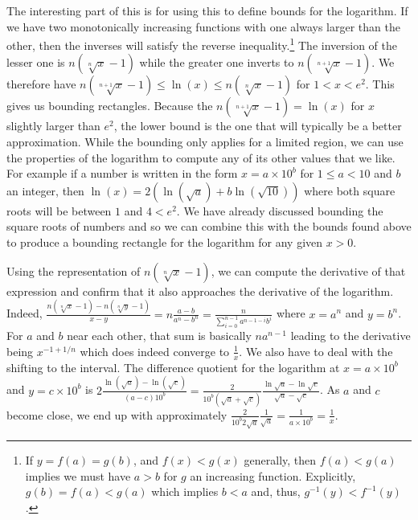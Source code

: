 \documentclass[12pt]{article}
\begin{document}
The interesting part of this is for using this to define bounds for the logarithm. If we have two monotonically increasing functions with one always larger than the other, then the inverses will satisfy the reverse inequality.\footnote{If $y = f(a)=g(b)$, and $f(x) < g(x)$ generally, then $f(a) < g(a)$ implies we must have $a > b$ for $g$ an increasing function. Explicitly, $g(b) = f(a) < g(a)$ which implies $b < a$ and, thus, $g^{-1} (y) < f^{-1} (y)$.}  The inversion of the lesser one is $n(\sqrt[n]{ x }- 1)$ while the greater one inverts to $n(\sqrt[n+1]{x} - 1)$. We therefore have $n(\sqrt[n+1]{x} - 1) \leq \ln(x) \leq n (\sqrt[n]{x}-1)$ for $1 < x < e^2$. This gives us bounding rectangles. Because the $n (\sqrt[n+1]{x} - 1) = \ln(x)$ for $x$ slightly larger than $e^2$, the lower bound is the one that will typically be a better approximation.  While the bounding only applies for a limited region, we can use the properties of the logarithm to compute any of its other values that we like. For example if a number is written in the form $x=a\times 10^b$ for $1 \leq a < 10$ and $b$ an integer, then $\ln(x) = 2 ( \ln( \sqrt{a} ) + b \ln(\sqrt{10}) )$ where both square roots will be between $1$ and $4< e^2$. We have already discussed bounding the square roots of numbers and so we can combine this with the bounds found above to produce a bounding rectangle for the logarithm for any given $x>0$. 

Using the representation of $ n (\sqrt[n]{x}-1)$, we can compute the derivative of that expression and confirm that it also approaches the derivative of the logarithm. Indeed, $\frac{ n (\sqrt[n]{x}-1) -  n (\sqrt[n]{y}-1)}{x-y} = n \frac{a-b}{a^n -b^n} = \frac{n}{\sum_{i=0}^{n-1} a^{n-1-i} b^i}$ where $x = a^n$ and $y = b^n$.  For $a$ and $b$ near each other, that sum is basically $n a^{n-1}$ leading to the derivative being $x^{-1+1/n}$ which does indeed converge to $\frac{1}{x}$. We also have to deal with the shifting to the interval. The difference quotient for the logarithm at $x = a\times 10^b$ and $y = c \times 10^b$ is $2 \frac{\ln(\sqrt{a}) - \ln(\sqrt{c})}{(a-c)10^b} = \frac{2}{10^b(\sqrt{a}+\sqrt{c})} \frac{\ln \sqrt{a} - \ln \sqrt{c} }{\sqrt{a}- \sqrt{c}} $. As $a$ and $c$ become close, we end up with approximately $\frac{2}{10^b 2 \sqrt{a}} \frac{1}{\sqrt{a}} = \frac{1}{a\times 10^b} = \frac{1}{x}$.


\normalem %
\printbibliography
\end{document}
